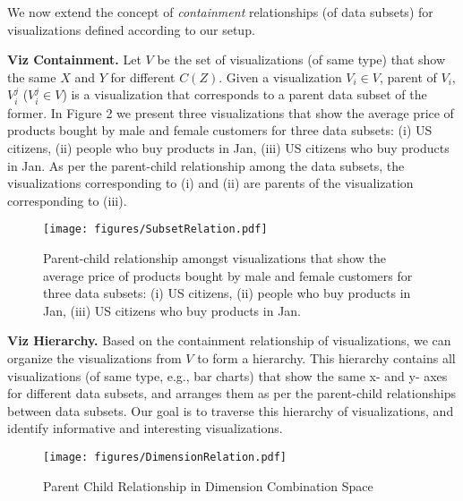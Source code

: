 We now extend the concept of \emph{containment} relationships (of data subsets) for visualizations defined according to our setup. 

\textbf{Viz Containment.} Let $V$ be the set of visualizations (of same type) that show the same $X$ and $Y$ for different $C(Z)$. Given a visualization $V_i \in V$, parent of $V_i$, $V_i^j$ ($V_i^j\in V$) is a visualization that corresponds to a parent data subset of the former. In Figure 2 we present three visualizations that show the average price of products bought by male and female customers for three data subsets: (i) US citizens, (ii) people who buy products in Jan, (iii) US citizens who buy products in Jan. As per the parent-child relationship among the data subsets, the visualizations corresponding to (i) and (ii) are parents of the visualization corresponding to (iii). %

\begin{figure}[bht]
\label{example}
\centering
\texttt{[image: figures/SubsetRelation.pdf]}
\caption{Parent-child relationship amongst visualizations that show the average price of products bought by male and female customers for three data subsets: (i) US citizens, (ii) people who buy products in Jan, (iii) US citizens who buy products in Jan.}
\end{figure}

\textbf{Viz Hierarchy.} Based on the containment relationship of visualizations, we can organize the visualizations from $V$ to form a hierarchy. This hierarchy contains all visualizations (of same type, e.g., bar charts) that show the same x- and y- axes for different data subsets, and arranges them as per the parent-child relationships between data subsets. Our goal is to traverse this hierarchy of visualizations, and identify informative and interesting visualizations.

\iffalse
\begin{figure}[bht]
\label{example}
\centering
\texttt{[image: figures/DimensionRelation.pdf]}
\caption{Parent Child Relationship in Dimension Combination Space}
\end{figure}


